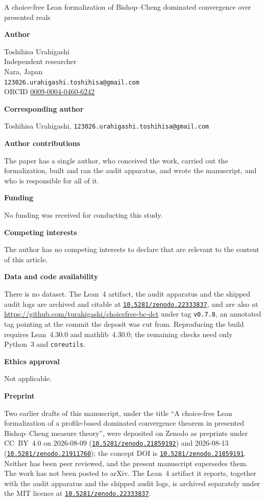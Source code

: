 \documentclass[11pt]{article}
\newcommand{\doi}[1]{\href{https://doi.org/#1}{\texttt{#1}}}
\begin{document}
\begin{center}
{\Large A choice-free Lean formalization of Bishop--Cheng dominated convergence
over presented reals}
\end{center}

\bigskip
\noindent\textbf{Author}

\smallskip
\noindent Toshihisa Urahigashi\\
Independent researcher\\
Nara, Japan\\
\texttt{123026.urahigashi.toshihisa@gmail.com}\\
ORCID \href{https://orcid.org/0009-0004-0460-6242}{0009-0004-0460-6242}

\bigskip
\noindent\textbf{Corresponding author}

\smallskip
\noindent Toshihisa Urahigashi, \texttt{123026.urahigashi.toshihisa@gmail.com}

\bigskip
\noindent\textbf{Author contributions}

\smallskip
\noindent The paper has a single author, who conceived the work, carried out the
formalization, built and ran the audit apparatus, and wrote the manuscript, and who
is responsible for all of it.

\bigskip
\noindent\textbf{Funding}

\smallskip
\noindent No funding was received for conducting this study.

\bigskip
\noindent\textbf{Competing interests}

\smallskip
\noindent The author has no competing interests to declare that are relevant to the
content of this article.

\bigskip
\noindent\textbf{Data and code availability}

\smallskip
\noindent There is no dataset.  The Lean~4 artifact, the audit apparatus and the
shipped audit logs are archived and citable at
\href{https://doi.org/10.5281/zenodo.22333837}{\texttt{10.5281/zenodo.22333837}},
and are also at \url{https://github.com/turahigashi/choicefree-bc-dct} under tag
\texttt{v0.7.8}, an annotated tag pointing at the commit the deposit was cut from.  Reproducing the build
requires Lean~4.30.0 and mathlib~4.30.0; the remaining checks need only Python~3
and \texttt{coreutils}.

\bigskip
\noindent\textbf{Ethics approval}

\smallskip
\noindent Not applicable.

\bigskip
\noindent\textbf{Preprint}

\smallskip
\noindent Two earlier drafts of this manuscript, under the title ``A choice-free
Lean formalization of a profile-based dominated convergence theorem in presented
Bishop--Cheng measure theory'', were deposited on Zenodo as preprints under
CC~BY~4.0 on 2026-08-09 (\doi{10.5281/zenodo.21859192}) and 2026-08-13
(\doi{10.5281/zenodo.21911760}); the concept DOI is
\doi{10.5281/zenodo.21859191}.  Neither has been peer reviewed, and the present
manuscript supersedes them.  The work has not been posted to arXiv.  The Lean~4
artifact it reports, together with the audit apparatus and the shipped audit
logs, is archived separately under the MIT licence at
\doi{10.5281/zenodo.22333837}.
\end{document}
